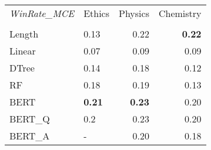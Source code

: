 \begin{tabular}{llrr}
\toprule
\textit{WinRate\_MCE} & Ethics &  Physics &  Chemistry \\
  &        &          &            \\
\midrule
Length &   0.13 &     0.22 &       \textbf{0.22} \\
Linear &   0.07 &     0.09 &       0.09 \\
DTree  &   0.14 &     0.18 &       0.12 \\
RF     &   0.18 &     0.19 &       0.13 \\
BERT   &   \textbf{0.21} &     \textbf{0.23} &       0.20 \\
BERT\_Q &    0.2 &     0.23 &       0.20 \\
BERT\_A &      - &     0.20 &       0.18 \\
\bottomrule
\end{tabular}
